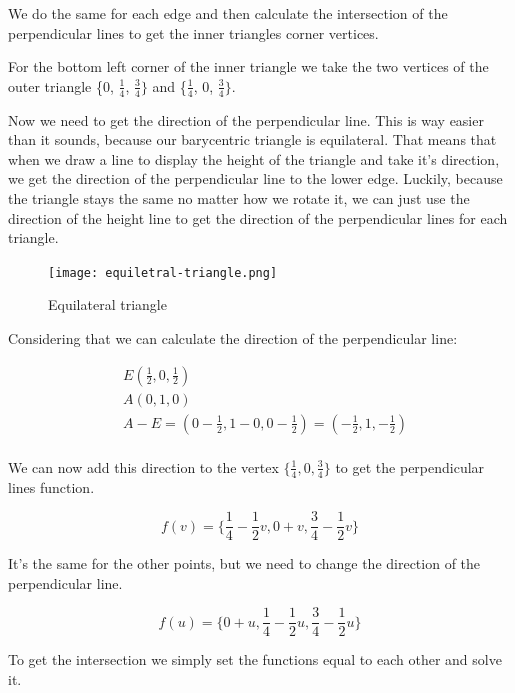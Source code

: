 \documentclass[12pt]{report} \usepackage{preamble}
\begin{document}
We do the same for each edge and then calculate the intersection of the
perpendicular lines to get the inner triangles corner vertices.

For the bottom left corner of the inner triangle we take the
two vertices of the outer triangle \{0, \(\frac{1}{4}\), \(\frac{3}{4}\}\)
and \{\(\frac{1}{4}\), 0, \(\frac{3}{4}\}\).

Now we need to get the direction of the perpendicular line.
This is way easier than it sounds, because our barycentric triangle is equilateral.
That means that when we draw a line to display the height of the triangle and take it's direction,
we get the direction of the perpendicular line to the lower edge.
Luckily, because the triangle stays the same no matter how we rotate it, we can just use
the direction of the height line to get the direction of the
perpendicular lines for each triangle. \cite{equilateral-triangle}

\begin{figure}[htbp]
	\centering \texttt{[image: equiletral-triangle.png]}
	\caption{Equilateral triangle}
	\cite{equilateral-triangle}
\end{figure} \Floatbarrier

Considering that we can calculate the direction of the perpendicular line:

\[
	\begin{aligned}
		 & E(\frac{1}{2}, 0, \frac{1}{2})                                                      \\
		 & A(0, 1, 0)                                                                          \\
		 & A - E = (0 - \frac{1}{2}, 1 - 0, 0 - \frac{1}{2}) = (-\frac{1}{2}, 1, -\frac{1}{2}) \\
	\end{aligned}
\]

We can now add this direction to the vertex \(\{\frac{1}{4}, 0, \frac{3}{4}\}\)
to get the perpendicular lines function.

\[
	f(v) = \{\frac{1}{4} - \frac{1}{2}v, 0 + v, \frac{3}{4} - \frac{1}{2}v\}
\]

It's the same for the other points, but we need to change the direction of the perpendicular line.

\[
	f(u) = \{0+u, \frac{1}{4} - \frac{1}{2}u, \frac{3}{4} - \frac{1}{2}u\}
\]

To get the intersection we simply set the functions equal to each other and solve it.
\end{document}
